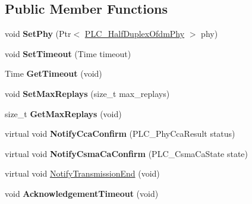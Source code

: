 \subsection*{\-Public \-Member \-Functions}
\begin{DoxyCompactItemize}
\item 
\hypertarget{classns3_1_1PLC__ArqMac_adc6122a4f5cdcd214c45193e7c3a778d}{void {\bfseries \-Set\-Phy} (\-Ptr$<$ \hyperlink{classns3_1_1PLC__HalfDuplexOfdmPhy}{\-P\-L\-C\-\_\-\-Half\-Duplex\-Ofdm\-Phy} $>$ phy)}\label{classns3_1_1PLC__ArqMac_adc6122a4f5cdcd214c45193e7c3a778d}

\item 
\hypertarget{classns3_1_1PLC__ArqMac_a9c87d1824eecd5db4bcef126e2ed0736}{void {\bfseries \-Set\-Timeout} (\-Time timeout)}\label{classns3_1_1PLC__ArqMac_a9c87d1824eecd5db4bcef126e2ed0736}

\item 
\hypertarget{classns3_1_1PLC__ArqMac_ac9dc2b68b0e67d5b5988adb2530472a5}{\-Time {\bfseries \-Get\-Timeout} (void)}\label{classns3_1_1PLC__ArqMac_ac9dc2b68b0e67d5b5988adb2530472a5}

\item 
\hypertarget{classns3_1_1PLC__ArqMac_a554c60629e3aa4a28c24139393e4b0bf}{void {\bfseries \-Set\-Max\-Replays} (size\-\_\-t max\-\_\-replays)}\label{classns3_1_1PLC__ArqMac_a554c60629e3aa4a28c24139393e4b0bf}

\item 
\hypertarget{classns3_1_1PLC__ArqMac_a4389129b4262638cfe68bb1b0305b5e3}{size\-\_\-t {\bfseries \-Get\-Max\-Replays} (void)}\label{classns3_1_1PLC__ArqMac_a4389129b4262638cfe68bb1b0305b5e3}

\item 
\hypertarget{classns3_1_1PLC__ArqMac_ab1ddbd6816eb1e36f9f270b50fc9afe1}{virtual void {\bfseries \-Notify\-Cca\-Confirm} (\-P\-L\-C\-\_\-\-Phy\-Cca\-Result status)}\label{classns3_1_1PLC__ArqMac_ab1ddbd6816eb1e36f9f270b50fc9afe1}

\item 
\hypertarget{classns3_1_1PLC__ArqMac_a18ceb1cd05a9fcb117133fb2135ecc4f}{virtual void {\bfseries \-Notify\-Csma\-Ca\-Confirm} (\-P\-L\-C\-\_\-\-Csma\-Ca\-State state)}\label{classns3_1_1PLC__ArqMac_a18ceb1cd05a9fcb117133fb2135ecc4f}

\item 
virtual void \hyperlink{classns3_1_1PLC__ArqMac_ac77a56684c784493baa9bb2fec7c5fb6}{\-Notify\-Transmission\-End} (void)
\item 
\hypertarget{classns3_1_1PLC__ArqMac_a2ffa9be47e82b676554e8d5bad031c98}{void {\bfseries \-Acknowledgement\-Timeout} (void)}\label{classns3_1_1PLC__ArqMac_a2ffa9be47e82b676554e8d5bad031c98}

\end{DoxyCompactItemize}
